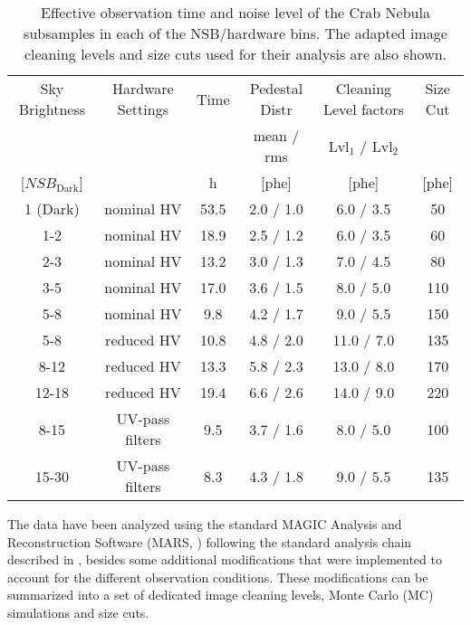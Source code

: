 \documentclass{PoS}
\begin{document}
\begin{table*}[t]
\centering
\begin{tabular}{| c | c | c | c | c | c |}
\hline
Sky Brightness & Hardware Settings & Time & Pedestal Distr & Cleaning Level factors & Size Cut \\
               &      &       &  mean / rms    &  $\text{Lvl}_1$ / $\text{Lvl}_2$  &       \\
               
[$\textit{NSB}_{\text{Dark}}$]  &  & h &  [phe]  & [phe]     &   [phe]  \\
\hline
   \hline

     1 (Dark) & nominal HV & 53.5 & 2.0 / 1.0 &  6.0 / 3.5 &  50  \\
     1-2 & nominal HV & 18.9 & 2.5 / 1.2 & 6.0 / 3.5 &  60 \\
     2-3 & nominal HV & 13.2 & 3.0 / 1.3 & 7.0 / 4.5 &  80 \\
     3-5 & nominal HV & 17.0 & 3.6 / 1.5 & 8.0 / 5.0 & 110 \\
     5-8 & nominal HV & 9.8 & 4.2 / 1.7 & 9.0 / 5.5 & 150 \\
        \hline

     5-8 & reduced HV & 10.8 & 4.8 / 2.0 & 11.0 / 7.0 & 135 \\
     8-12 & reduced HV & 13.3 & 5.8 / 2.3 & 13.0 / 8.0 & 170 \\
     12-18 & reduced HV & 19.4 & 6.6 / 2.6 & 14.0 / 9.0 & 220 \\
        \hline

     8-15 & UV-pass filters & 9.5 & 3.7 / 1.6 & 8.0 / 5.0 & 100  \\
     15-30 & UV-pass filters & 8.3 & 4.3 / 1.8 & 9.0 / 5.5 & 135\\
   \hline
 \end{tabular}
 \caption{Effective observation time and noise level of the Crab Nebula subsamples in each of the NSB/hardware bins. The adapted image cleaning levels and size cuts used for their analysis are also shown.}
 \label{tabNoise}
 \end{table*}
 

The data have been analyzed using the standard MAGIC Analysis and Reconstruction Software (MARS, \cite{TrueMARS}) following the standard analysis chain described in \cite{upgrade2}, besides some additional modifications that were implemented to account for the different observation conditions. These modifications can be summarized into a set of dedicated image cleaning levels, Monte Carlo (MC) simulations and size cuts.
\end{document}
